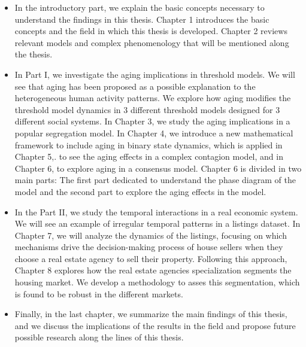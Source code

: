 \begin{itemize}
    \item In the introductory part, we explain the basic concepts necessary to understand the findings in this thesis. Chapter 1 introduces the basic concepts and the field in which this thesis is developed. Chapter 2 reviews relevant models and complex phenomenology that will be mentioned along the thesis. 

    \item In Part I, we investigate the aging implications in threshold models. We will see that aging has been proposed as a possible explanation to the heterogeneous human activity patterns. We explore how aging modifies the threshold model dynamics in 3 different threshold models designed for 3 different social systems. In Chapter 3, we study the aging implications in a popular segregation model. In Chapter 4, we introduce a new mathematical framework to include aging in binary state dynamics, which is applied in Chapter 5,. to see the aging effects in a complex contagion model, and in Chapter 6, to explore aging in a consensus model. Chapter 6 is divided in two main parts: The first part dedicated to understand the phase diagram of the model and the second part to explore the aging effects in the model.
    
    \item In the Part II, we study the temporal interactions in a real economic system. We will see an example of irregular temporal patterns in a listings dataset. In Chapter 7, we will analyze the dynamics of the listings, focusing on which mechanisms drive the decision-making process of house sellers when they choose a real estate agency to sell their property. Following this approach, Chapter 8 explores how the real estate agencies specialization segments the housing market. We develop a methodology to asses this segmentation, which is found to be robust in the different markets.
    
    \item Finally, in the last chapter, we summarize the main findings of this thesis, and we discuss the implications of the results in the field and propose future possible research along the lines of this thesis.
\end{itemize}
